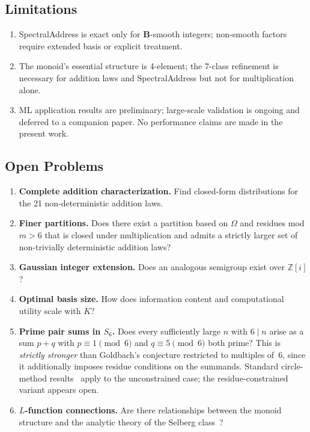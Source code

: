 \documentclass[10pt,twocolumn]{article}
\newcommand{\Om}{\Omega}
\newcommand{\B}{\mathbf{B}}
\newcommand{\Z}{\mathbb{Z}}
\begin{document}
\subsection{Limitations}

\begin{enumerate}[noitemsep, topsep=2pt]
\item SpectralAddress is exact only for $\B$-smooth integers; non-smooth
      factors require extended basis or explicit treatment.
\item The monoid's essential structure is 4-element; the 7-class
      refinement is necessary for addition laws and SpectralAddress but
      not for multiplication alone.
\item ML application results are preliminary; large-scale validation is
      ongoing and deferred to a companion paper. No performance claims are
      made in the present work.
\end{enumerate}

\subsection{Open Problems}

\begin{enumerate}[noitemsep, topsep=2pt]
\item \textbf{Complete addition characterization.} Find closed-form
      distributions for the 21 non-deterministic addition laws.
\item \textbf{Finer partitions.} Does there exist a partition based on
      $\Om$ and residues mod $m > 6$ that is closed under multiplication
      and admits a strictly larger set of non-trivially deterministic
      addition laws?
\item \textbf{Gaussian integer extension.} Does an analogous semigroup
      exist over $\Z[i]$?
\item \textbf{Optimal basis size.} How does information content and
      computational utility scale with $K$?
\item \textbf{Prime pair sums in $S_6$.} Does every sufficiently large
      $n$ with $6 \mid n$ arise as a sum $p + q$ with $p \equiv 1\pmod{6}$
      and $q \equiv 5\pmod{6}$ both prime? This is \emph{strictly stronger}
      than Goldbach's conjecture restricted to multiples of~6, since it
      additionally imposes residue conditions on the summands. Standard
      circle-method results~\cite{Nathanson1996} apply to the unconstrained
      case; the residue-constrained variant appears open.
\item \textbf{$L$-function connections.} Are there relationships between
      the monoid structure and the analytic theory of the Selberg
      class~\cite{IwaniecKowalski2004}?
\end{enumerate}
\end{document}
